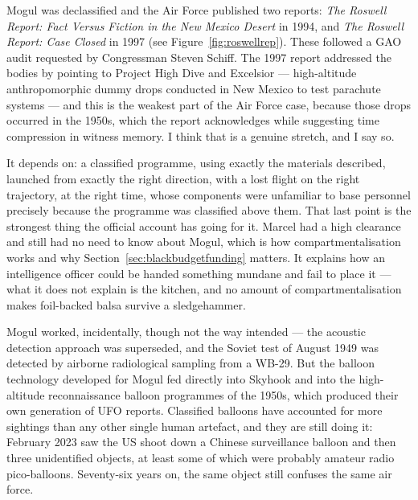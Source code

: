 Mogul was declassified and the Air Force published two reports: \emph{The Roswell Report: Fact
Versus Fiction in the New Mexico Desert} in 1994, and \emph{The Roswell Report: Case Closed} in 1997 (see Figure~\ref{fig:roswellrep}). These followed a GAO audit requested by Congressman Steven Schiff. The 1997 report addressed
the bodies by pointing to Project High Dive and Excelsior --- high-altitude anthropomorphic dummy
drops conducted in New Mexico to test parachute systems --- and this is the weakest part of the
Air Force case, because those drops occurred in the 1950s, which the report acknowledges while
suggesting time compression in witness memory. I think that is a genuine stretch, and I say so.

 It depends on: a classified programme,
using exactly the materials described, launched from exactly the right direction, with a lost
flight on the right trajectory, at the right time, whose components were unfamiliar to base
personnel precisely because the programme was classified above them. That last point is the strongest
thing the official account has going for it. Marcel had a high clearance and still had no need to know
about Mogul, which is how compartmentalisation works and why
Section~\ref{sec:blackbudgetfunding} matters. It explains how an intelligence officer could be handed
something mundane and fail to place it --- what it does not explain is the kitchen, and no amount of
compartmentalisation makes foil-backed balsa survive a sledgehammer.

\begin{funfact}
Mogul worked, incidentally, though not the way intended --- the acoustic detection approach was
superseded, and the Soviet test of August 1949 was detected by airborne radiological sampling from
a WB-29. But the balloon technology developed for Mogul fed directly into Skyhook and into the
high-altitude reconnaissance balloon programmes of the 1950s, which produced their own generation
of UFO reports. Classified balloons have accounted for more sightings than any other single human
artefact, and they are still doing it: February 2023 saw the US shoot down a Chinese surveillance
balloon and then three unidentified objects, at least some of which were probably amateur
radio pico-balloons. Seventy-six years on, the same object still confuses the same air force.
\end{funfact}

